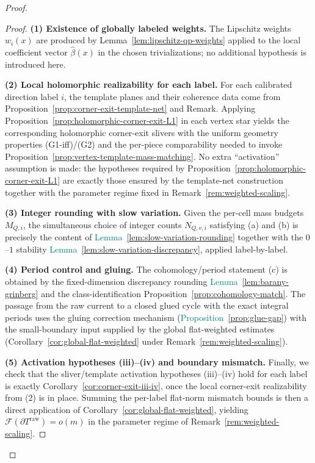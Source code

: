 \documentclass[11pt]{article}
\newcommand{\REVMZ}[1]{\textcolor{teal}{#1}}  %
\numberwithin{equation}{section}  %
\theoremstyle{plain}
\theoremstyle{definition}
\theoremstyle{remark}
\begin{document}
\begin{proof}
\begin{proof}
\smallskip\noindent
\textbf{(1) Existence of globally labeled weights.}
The Lipschitz weights $w_i(x)$ are produced by Lemma~\ref{lem:lipschitz-qp-weights} applied to the local coefficient vector
$\widehat\beta(x)$ in the chosen trivializations; no additional hypothesis is introduced here.

\smallskip\noindent
\textbf{(2) Local holomorphic realizability for each label.}
For each calibrated direction label $i$, the template planes and their coherence data come from
Proposition~\ref{prop:corner-exit-template-net} and Remark.
Applying Proposition~\ref{prop:holomorphic-corner-exit-L1} in each vertex star yields the corresponding holomorphic corner-exit slivers
with the uniform geometry properties (G1-iff)/(G2) and the per-piece comparability needed to invoke
Proposition~\ref{prop:vertex-template-mass-matching}.
No extra ``activation'' assumption is made: the hypotheses required by Proposition~\ref{prop:holomorphic-corner-exit-L1}
are exactly those ensured by the template-net construction together with the parameter regime fixed in Remark~\ref{rem:weighted-scaling}.

\smallskip\noindent
\textbf{(3) Integer rounding with slow variation.}
Given the per-cell mass budgets $M_{Q,i}$, the simultaneous choice of integer counts $N_{Q,v,i}$
satisfying \textnormal{(a)} and \textnormal{(b)} is precisely the content of \REVMZ{Lemma~\ref{lem:slow-variation-rounding}}
together with the $0$--$1$ stability \REVMZ{Lemma~\ref{lem:slow-variation-discrepancy}}, applied label-by-label.

\smallskip\noindent
\textbf{(4) Period control and gluing.}
The cohomology/period statement \textnormal{(c)} is obtained by the fixed-dimension discrepancy rounding
\REVMZ{Lemma~\ref{lem:barany-grinberg}} and the class-identification Proposition~\ref{prop:cohomology-match}.
The passage from the raw current to a closed glued cycle with the exact integral periods uses the gluing correction mechanism
(\REVMZ{Proposition~\ref{prop:glue-gap}}) with the small-boundary input supplied by the global flat-weighted estimates
(Corollary~\ref{cor:global-flat-weighted} under Remark~\ref{rem:weighted-scaling}).

\smallskip\noindent
\textbf{(5) Activation hypotheses (iii)--(iv) and boundary mismatch.}
Finally, we check that the sliver/template activation hypotheses \textnormal{(iii)}--\textnormal{(iv)} hold for each label
is exactly Corollary~\ref{cor:corner-exit-iii-iv}, once the local corner-exit realizability from (2) is in place.
Summing the per-label flat-norm mismatch bounds is then a direct application of Corollary~\ref{cor:global-flat-weighted},
yielding $\mathcal F(\partial T^{\mathrm{raw}})=o(m)$ in the parameter regime of Remark~\ref{rem:weighted-scaling}.


\end{proof}
\end{proof}
\end{document}
